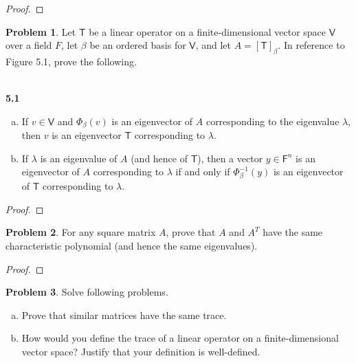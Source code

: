 \documentclass[12pt]{book}
\theoremstyle{definition}
\newtheorem{problem}{Problem}
\begin{document}
	\begin{proof}
	\end{proof}
	\newpage
	\begin{problem}
		Let $\mathsf{T}$ be a linear operator on a finite-dimensional vector space $\mathsf{V}$ over a field $F$, let $\beta$ be an ordered basis for $\mathsf{V}$, and let $A=[\mathsf{T}]_\beta$. In reference to Figure 5.1, prove the following.
		\begin{center}
			\\[10pt]
			\textbf{\figurename{ 5.1}}
		\end{center}
		\begin{enumerate}[(a)]
			\item If $v\in \mathsf{V}$ and $\Phi_\beta(v)$ is an eigenvector of $A$ corresponding to the eigenvalue $\lambda$, then $v$ is an eigenvector $\mathsf{T}$ corresponding to $\lambda$.
			\item If $\lambda$ is an eigenvalue of $A$ (and hence of $\mathsf{T}$), then a vector $y\in\mathsf{F}^n$ is an eigenvector of $A$ corresponding to $\lambda$ if and only if $\Phi_\beta^{-1}(y)$ is an eigenvector of $\mathsf{T}$ corresponding to $\lambda$.
		\end{enumerate}
	\end{problem}
	\begin{proof}
	\end{proof}
	\newpage
	\begin{problem}
		For any square matrix $A$, prove that $A$ and $A^T$ have the same characteristic polynomial (and hence the same eigenvalues).
	\end{problem}
	\begin{proof}
	\end{proof}
	\newpage
	\begin{problem}
		Solve following problems.
		\begin{enumerate}[(a)]
			\item Prove that similar matrices have the same trace.
			\item How would you define the trace of a linear operator on a finite-dimensional vector space? Justify that your definition is well-defined.
		\end{enumerate}
	\end{problem}
\end{document}
